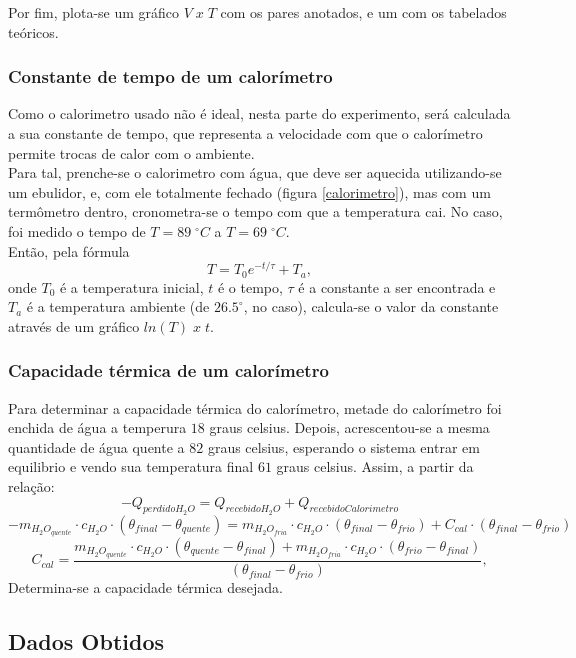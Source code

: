 \documentclass[12pt,a4paper]{article}
\begin{document}
Por fim, plota-se um gráfico $V \; x \; T$ com os pares anotados, e um com os tabelados teóricos.\\

\subsubsection{Constante de tempo de um calorímetro}

Como o calorimetro usado não é ideal, nesta parte do experimento, será calculada a sua constante de tempo, que representa a velocidade com que o calorímetro permite trocas de calor com o ambiente.\\
Para tal, prenche-se o calorimetro com água, que deve ser aquecida utilizando-se um ebulidor, e, com ele totalmente fechado (figura \ref{calorimetro}), mas com um termômetro dentro, cronometra-se o tempo com que a temperatura cai. No caso, foi medido o tempo de $T = 89 \; ^{\circ} C$ a $T = 69 \; ^{\circ} C$.\\
Então, pela fórmula 
$$T = T_0 e ^{-t/\tau} + T_a,$$
onde $T_0$ é a temperatura inicial, $t$ é o tempo, $\tau$ é a constante a ser encontrada e $T_a$ é a temperatura ambiente (de $26.5 ^{\circ}$, no caso), calcula-se o valor da constante através de um gráfico $ln(T) \; x \; t$.


\subsubsection{Capacidade térmica de um calorímetro}
Para determinar a capacidade térmica do calorímetro, metade do calorímetro foi enchida de água a temperura $18$ graus celsius. Depois, acrescentou-se a mesma quantidade de água quente a $82$ graus celsius, esperando o sistema entrar em equilibrio e vendo sua temperatura final $61$ graus celsius. Assim, a partir da relação:
$$-Q_{perdido H_2O} = Q_{recebido H_2O} + Q_{recebido Calorimetro}$$
$$-m_{H_2O_{quente}}\cdot c_{H_2O} \cdot (\theta_{final}-\theta_{quente}) = m_{H_2O_{fria}}\cdot c_{H_2O} \cdot (\theta_{final}-\theta_{frio}) + C_{cal}\cdot (\theta_{final}-\theta_{frio}) $$
$$C_{cal} = \frac{m_{H_2O_{quente}}\cdot c_{H_2O}\cdot(\theta_{quente} - \theta_{final}) + m_{H_2O_{fria}}\cdot c_{H_2O}\cdot(\theta_{frio} - \theta_{final})}{(\theta_{final}-\theta_{frio})},$$
Determina-se a capacidade térmica desejada.


\subsection{Dados Obtidos}
\end{document}
